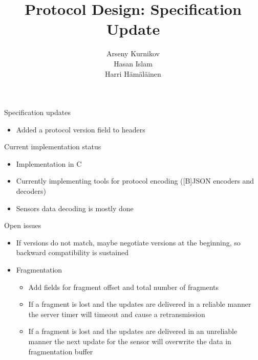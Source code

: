\documentclass{beamer}
\title{Protocol Design: Specification Update}
\author{Arseny Kurnikov\\
Hasan Islam\\
Harri Hämäläinen}
\begin{document}
\begin{frame}
\titlepage
\end{frame}


\begin{frame}{Specification updates}
    \begin{itemize}
        \item Added a protocol version field to headers
    \end{itemize}
\end{frame}

\begin{frame}{Current implementation status}
    \begin{itemize}
        \item Implementation in C
        \item Currently implementing tools for protocol encoding ([B]JSON
        encoders and decoders)
        \item Sensors data decoding is mostly done
    \end{itemize}
\end{frame}

\begin{frame}{Open issues}
    \begin{itemize}
        \item If versions do not match, maybe negotiate versions at the beginning,
              so backward compatibility is sustained
        \item Fragmentation
        \begin{itemize}
            \item Add fields for fragment offset and total number of fragments
            \item If a fragment is lost and the updates are delivered in
            a reliable manner the server timer will timeout and cause a
            retransmission
            \item If a fragment is lost and the updates are delivered in an
            unreliable manner the next update for the sensor will overwrite the
            data in fragmentation buffer
        \end{itemize}
    \end{itemize}
\end{frame}
\end{document}

